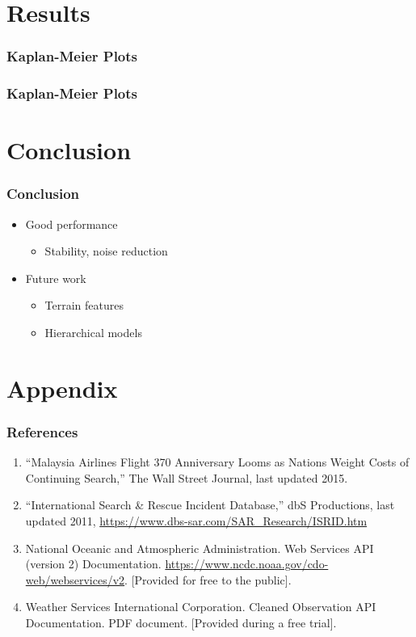 \documentclass[serif,final,bigger]{beamer}
\begin{document}
  \section{Results}


  \begin{frame}
    \frametitle{Kaplan-Meier Plots}
    
  \end{frame}

  \begin{frame}
    \frametitle{Kaplan-Meier Plots}
    
  \end{frame}

  \section{Conclusion}

  \begin{frame}
    \frametitle{Conclusion}
    \begin{itemize}
      \item Good performance
      \begin{itemize}
        \item Stability, noise reduction
      \end{itemize}
      \item Future work
      \begin{itemize}
        \item Terrain features
        \item Hierarchical models
      \end{itemize}
    \end{itemize}
  \end{frame}

  \section{Appendix}

  \begin{frame}
    \frametitle{References}
    \linespread{1}
    \ssmall
    \begin{enumerate}
      \item “Malaysia Airlines Flight 370 Anniversary Looms as Nations Weight Costs of Continuing Search,” The Wall Street Journal, last updated 2015.
      \item “International Search \& Rescue Incident Database,” dbS Productions, last updated 2011, \url{https://www.dbs-sar.com/SAR_Research/ISRID.htm}
      \item National Oceanic and Atmospheric Administration. Web Services API (version 2) Documentation. \url{https://www.ncdc.noaa.gov/cdo-web/webservices/v2}. [Provided for free to the public].
      \item Weather Services International Corporation. Cleaned Observation API Documentation. PDF document. [Provided during a free trial].
    \end{enumerate}
  \end{frame}
\end{document}
